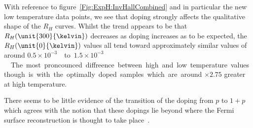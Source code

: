 With reference to figure~\ref{Fig:ExpH:InvHallCombined} and in particular the new low temperature data points, we see that doping strongly affects the qualitative shape of the $R_H$ curves. Whilst the trend appears to be that $R_H(\unit{300}{\kelvin})$ decreases as doping increases as to be expected, the $R_H(\unit{0}{\kelvin})$ values all tend toward approximately similar values of around \unit{$0.5\times 10^{-3}$}{\centi\metre\cubed}to \unit{$1.5\times 10^{-3}$}{\centi\metre\cubed}. The most proncounced diffreence between high and low temperature values though is with the optimally doped samples which are around $\times 2.75$ greater at high temperature.

There seems to be little evidence of the transition of the doping from $p$ to $1+p$ which agrees with the notion that these dopings lie beyond where the Fermi surface reconstruction is thought to take place~\cite{LeBoeuf2007}. 




